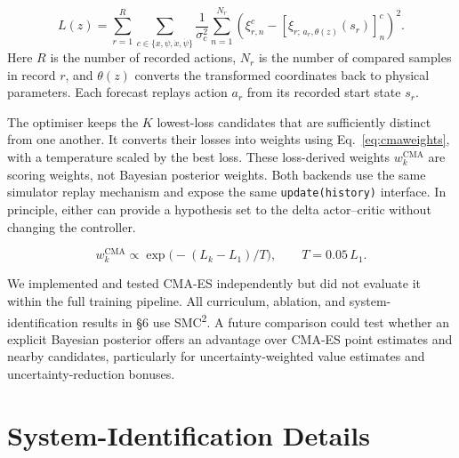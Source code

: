 \documentclass[12pt]{article}
\begin{document}
\begin{equation}
L(z)=\sum_{r=1}^{R}\sum_{c\in\{x,\psi,\dot x,\dot\psi\}}\frac{1}{\sigma_c^2}
\sum_{n=1}^{N_r}\left(\xi_{r,n}^c-[\hat{\xi}_{r;\,a_r,\theta(z)}(s_r)]_n^c\right)^2.
\label{eq:cmaloss}\end{equation}
Here $R$ is the number of recorded actions, $N_r$ is the number of compared samples in record $r$, and $\theta(z)$ converts the transformed coordinates back to physical parameters. Each forecast replays action $a_r$ from its recorded start state $s_r$.

The optimiser keeps the \(K\) lowest-loss candidates that are sufficiently distinct from one another. It converts their losses into weights using Eq.~\eqref{eq:cmaweights}, with a temperature scaled by the best loss. These loss-derived weights $w_k^{\mathrm{CMA}}$ are scoring weights, not Bayesian posterior weights. Both backends use the same simulator replay mechanism and expose the same \texttt{update(history)} interface. In principle, either can provide a hypothesis set to the delta actor--critic without changing the controller.

\begin{equation}w_k^{\mathrm{CMA}}\propto\exp\!\big(-(L_k-L_1)/T\big),\qquad T=0.05\,L_1.\label{eq:cmaweights}\end{equation}

We implemented and tested CMA-ES independently but did not evaluate it within the full training pipeline. All curriculum, ablation, and system-identification results in \S{}6 use SMC\textsuperscript{2}. A future comparison could test whether an explicit Bayesian posterior offers an advantage over CMA-ES point estimates and nearby candidates, particularly for uncertainty-weighted value estimates and uncertainty-reduction bonuses.

\section{System-Identification Details}\label{app:detailed-sysid}
\end{document}
